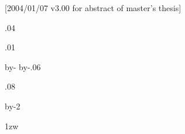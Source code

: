 %
%
%
%
  [2004/01/07 v3.00 for abstract of master's thesis]

\usepackage{multirow}
\usepackage{tabularx}

\voffset -1in
\hoffset -1in

\renewcommand{\baselinestretch}{1.05}

\topmargin .04\paperheight

\headsep .01\paperheight

\textheight \paperheight
\advance\textheight by-\topmargin
\advance\textheight by-.06\paperheight %

\oddsidemargin .08\paperwidth
\evensidemargin \oddsidemargin

\newlength{\framesidesep}
\setlength{\framesidesep}{.02\textwidth}

\textwidth \paperwidth
\advance\textwidth by-2\oddsidemargin %

\parindent 1zw

\columnsep

\def\captionfontsize{}

\def\修了年度#1{\def\@修了年度{#1}} \def\@修了年度{}
\def\題目#1{\def\@題目{#1}} \def\@題目{}
\def\研究室#1{\def\@研究室{#1}} \def\@研究室{}
\def\学籍番号#1{\def\@学籍番号{#1}} \def\@学籍番号{}
\def\氏名#1{\def\@氏名{#1}} \def\@氏名{}
\def\name#1{\def\@name{#1}} \def\@name{}
\newcount\@unt@
\newcount\@@unt@

